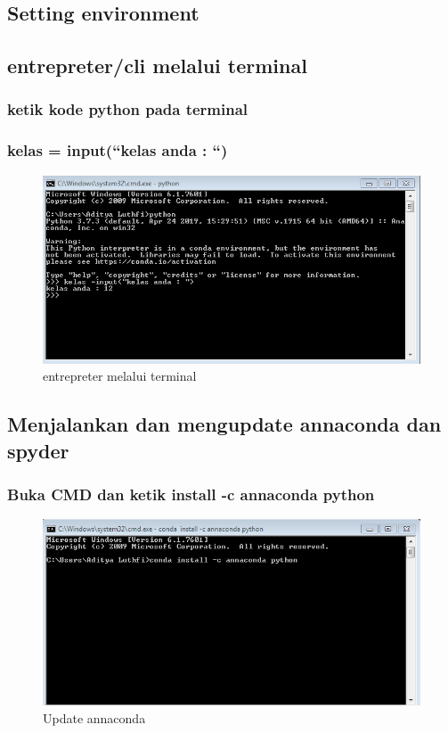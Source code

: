 \documentclass[12pt, times new roman, a4paper]{article}
\begin{document}
\subsection{Setting environment}
	
\subsection{entrepreter/cli melalui terminal}
\subsubsection{ketik kode python pada terminal}
\subsubsection{kelas = input(“kelas anda : “)}
	\begin{figure}[h]
		\centering
		\includegraphics[scale=0.4]{Gambar/e}
		\caption{entrepreter melalui terminal}
	\end{figure}
	
\subsection{Menjalankan dan mengupdate annaconda dan spyder}
	
\subsubsection{Buka CMD dan ketik install -c annaconda python}
	\begin{figure}[h]
		\centering
		\includegraphics[scale=0.3]{Gambar/c1}
		\caption{Update annaconda}
	\end{figure}
\end{document}
